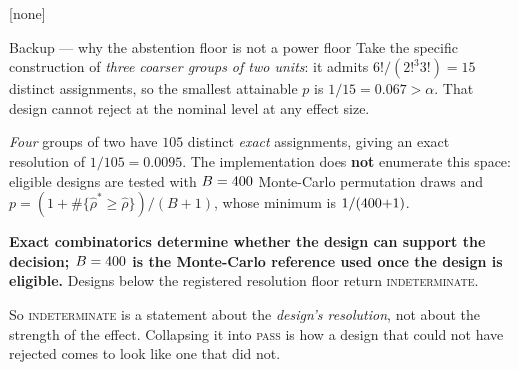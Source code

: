 \documentclass[aspectratio=169,11pt]{beamer}
\begin{document}
\appendix
[none]

\begin{frame}{Backup --- why the abstention floor is not a power floor}
  \small
  Take the specific construction of \emph{three coarser groups of two units}: it admits
  $6!/(2!^{3}3!) = 15$ distinct assignments, so the smallest attainable $p$ is
  $1/15 = 0.067 > \alpha$. That design cannot reject at the nominal level at any effect size.

  \vspace{0.5em}
  \emph{Four} groups of two have $105$ distinct \emph{exact} assignments, giving an exact
  resolution of $1/105 = 0.0095$. The implementation does \textbf{not} enumerate this space:
  eligible designs are tested with $B=400$ Monte-Carlo permutation draws and
  $p=(1+\#\{\hat{\rho}^{*}\ge\hat{\rho}\})/(B+1)$, whose minimum is $1/(400{+}1)$.
  \vspace{0.5em}

  \textbf{Exact combinatorics determine whether the design can support the decision;
  $B=400$ is the Monte-Carlo reference used once the design is eligible.}
  Designs below the registered resolution floor return \textsc{indeterminate}.

  \vspace{0.8em}
  So \textsc{indeterminate} is a statement about the \emph{design's resolution}, not about the
  strength of the effect. Collapsing it into \textsc{pass} is how a design that could not have
  rejected comes to look like one that did not.
\end{frame}
\end{document}
